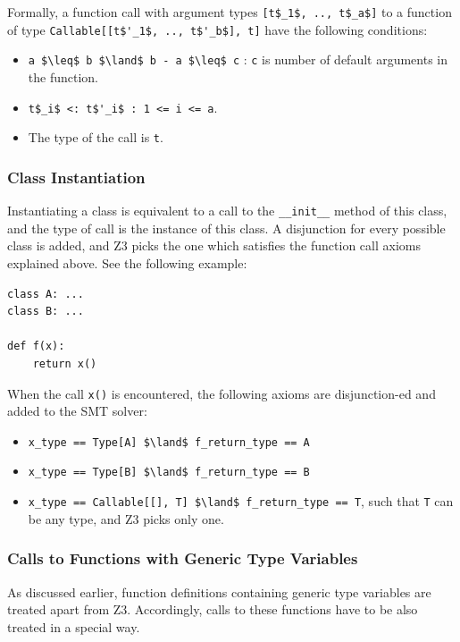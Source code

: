 Formally, a function call with argument types \lstinline[mathescape]|[t$_1$, .., t$_a$]| to a function of type \lstinline[mathescape]|Callable[[t$'_1$, .., t$'_b$], t]| have the following conditions:
\begin{itemize}
	\item \lstinline[mathescape]|a $\leq$ b $\land$ b - a $\leq$ c| : \lstinline|c| is number of default arguments in the function.
	\item \lstinline[mathescape]|t$_i$ <: t$'_i$ : 1 <= i <= a|.
	\item The type of the call is \lstinline|t|.
\end{itemize}

\subsubsection{Class Instantiation}
Instantiating a class is equivalent to a call to the \lstinline|__init__| method of this class, and the type of call is the instance of this class. A disjunction for every possible class is added, and Z3 picks the one which satisfies the function call axioms explained above. See the following example:
\begin{lstlisting}
class A: ...
class B: ...

def f(x):
	return x()
\end{lstlisting}

When the call \lstinline|x()| is encountered, the following axioms are disjunction-ed and added to the SMT solver:

\begin{itemize}
	\item \lstinline[mathescape]|x_type == Type[A] $\land$ f_return_type == A|
	\item \lstinline[mathescape]|x_type == Type[B] $\land$ f_return_type == B|
	\item \lstinline[mathescape]|x_type == Callable[[], T] $\land$ f_return_type == T|, such that \lstinline|T| can be any type, and Z3 picks only one.
\end{itemize}

\subsubsection{Calls to Functions with Generic Type Variables}
As discussed earlier, function definitions containing generic type variables are treated apart from Z3. Accordingly, calls to these functions have to be also treated in a special way.\\


